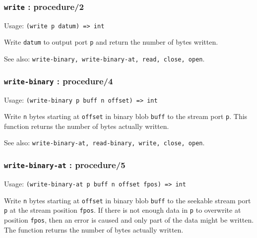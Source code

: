 \documentclass[
]{article}
\newcommand{\passthrough}[1]{#1}
\begin{document}
\hypertarget{write-procedure2}{%
\subsubsection{\texorpdfstring{\texttt{write} :
procedure/2}{write : procedure/2}}\label{write-procedure2}}

Usage: \passthrough{\lstinline!(write p datum) => int!}

Write \passthrough{\lstinline!datum!} to output port
\passthrough{\lstinline!p!} and return the number of bytes written.

See also:
\passthrough{\lstinline!write-binary, write-binary-at, read, close, open!}.

\hypertarget{write-binary-procedure4}{%
\subsubsection{\texorpdfstring{\texttt{write-binary} :
procedure/4}{write-binary : procedure/4}}\label{write-binary-procedure4}}

Usage: \passthrough{\lstinline!(write-binary p buff n offset) => int!}

Write \passthrough{\lstinline!n!} bytes starting at
\passthrough{\lstinline!offset!} in binary blob
\passthrough{\lstinline!buff!} to the stream port
\passthrough{\lstinline!p!}. This function returns the number of bytes
actually written.

See also:
\passthrough{\lstinline!write-binary-at, read-binary, write, close, open!}.

\hypertarget{write-binary-at-procedure5}{%
\subsubsection{\texorpdfstring{\texttt{write-binary-at} :
procedure/5}{write-binary-at : procedure/5}}\label{write-binary-at-procedure5}}

Usage:
\passthrough{\lstinline!(write-binary-at p buff n offset fpos) => int!}

Write \passthrough{\lstinline!n!} bytes starting at
\passthrough{\lstinline!offset!} in binary blob
\passthrough{\lstinline!buff!} to the seekable stream port
\passthrough{\lstinline!p!} at the stream position
\passthrough{\lstinline!fpos!}. If there is not enough data in
\passthrough{\lstinline!p!} to overwrite at position
\passthrough{\lstinline!fpos!}, then an error is caused and only part of
the data might be written. The function returns the number of bytes
actually written.
\end{document}
